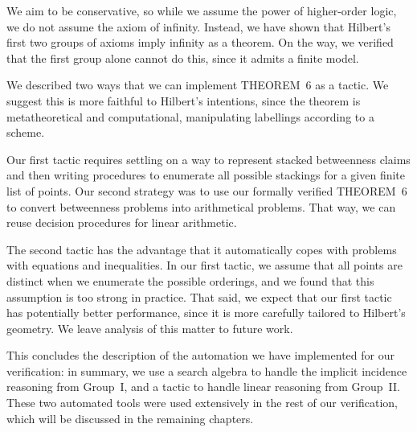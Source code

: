 We aim to be conservative, so while we assume the power of higher-order logic, we do not assume the axiom of infinity. Instead, we have shown that Hilbert's first two groups of axioms imply infinity as a theorem. On the way, we verified that the first group alone cannot do this, since it admits a finite model.

We described two ways that we can implement THEOREM~6 as a tactic. We suggest this is more faithful to Hilbert's intentions, since the theorem is metatheoretical and computational, manipulating labellings according to a scheme.

Our first tactic requires settling on a way to represent stacked betweenness claims and then writing procedures to enumerate all possible stackings for a given finite list of points. Our second strategy was to use our formally verified THEOREM~6 to convert betweenness problems into arithmetical problems. That way, we can reuse decision procedures for linear arithmetic.

The second tactic has the advantage that it automatically copes with problems with equations and inequalities. In our first tactic, we assume that all points are distinct when we enumerate the possible orderings,  and we found that this assumption is too strong in practice. That said, we expect that our first tactic has potentially better performance, since it is more carefully tailored to Hilbert's geometry. We leave analysis of this matter to future work.

This concludes the description of the automation we have implemented for our verification: in summary, we use a search algebra to handle the implicit incidence reasoning from Group~I, and a tactic to handle linear reasoning from Group~II. These two automated tools were used extensively in the rest of our verification, which will be discussed in the remaining chapters. 




